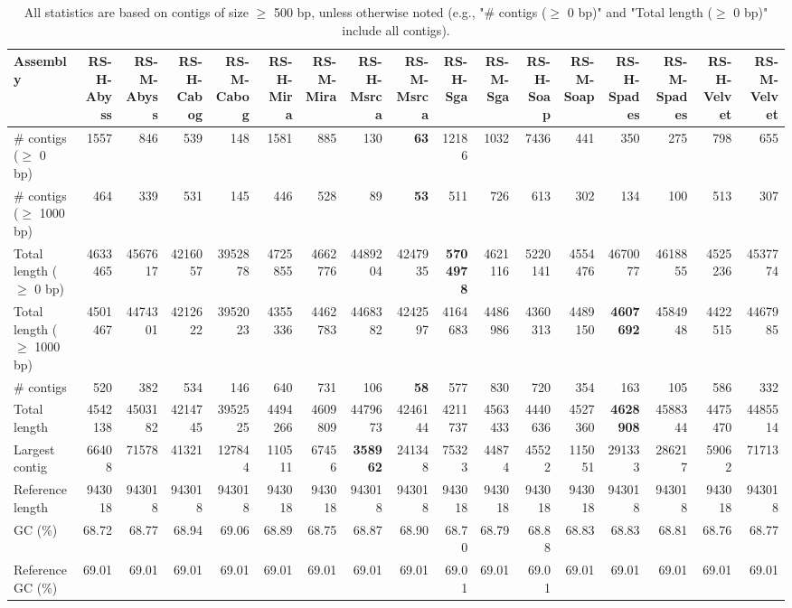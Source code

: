 \documentclass[12pt,a4paper]{article}
\begin{document}
\begin{table}[ht]
\begin{center}
\caption{All statistics are based on contigs of size $\geq$ 500 bp, unless otherwise noted (e.g., "\# contigs ($\geq$ 0 bp)" and "Total length ($\geq$ 0 bp)" include all contigs).}
\begin{tabular}{|l*{16}{|r}|}
\hline
Assembly & RS-H-Abyss & RS-M-Abyss & RS-H-Cabog & RS-M-Cabog & RS-H-Mira & RS-M-Mira & RS-H-Msrca & RS-M-Msrca & RS-H-Sga & RS-M-Sga & RS-H-Soap & RS-M-Soap & RS-H-Spades & RS-M-Spades & RS-H-Velvet & RS-M-Velvet \\ \hline
\# contigs ($\geq$ 0 bp) & 1557 & 846 & 539 & 148 & 1581 & 885 & 130 & {\bf 63} & 12186 & 1032 & 7436 & 441 & 350 & 275 & 798 & 655 \\ \hline
\# contigs ($\geq$ 1000 bp) & 464 & 339 & 531 & 145 & 446 & 528 & 89 & {\bf 53} & 511 & 726 & 613 & 302 & 134 & 100 & 513 & 307 \\ \hline
Total length ($\geq$ 0 bp) & 4633465 & 4567617 & 4216057 & 3952878 & 4725855 & 4662776 & 4489204 & 4247935 & {\bf 5704978} & 4621116 & 5220141 & 4554476 & 4670077 & 4618855 & 4525236 & 4537774 \\ \hline
Total length ($\geq$ 1000 bp) & 4501467 & 4474301 & 4212622 & 3952023 & 4355336 & 4462783 & 4468382 & 4242597 & 4164683 & 4486986 & 4360313 & 4489150 & {\bf 4607692} & 4584948 & 4422515 & 4467985 \\ \hline
\# contigs & 520 & 382 & 534 & 146 & 640 & 731 & 106 & {\bf 58} & 577 & 830 & 720 & 354 & 163 & 105 & 586 & 332 \\ \hline
Total length & 4542138 & 4503182 & 4214745 & 3952525 & 4494266 & 4609809 & 4479673 & 4246144 & 4211737 & 4563433 & 4440636 & 4527360 & {\bf 4628908} & 4588344 & 4475470 & 4485514 \\ \hline
Largest contig & 66408 & 71578 & 41321 & 127844 & 110511 & 67456 & {\bf 358962} & 241348 & 75323 & 44874 & 45522 & 115051 & 291333 & 286217 & 59062 & 71713 \\ \hline
Reference length & 943018 & 943018 & 943018 & 943018 & 943018 & 943018 & 943018 & 943018 & 943018 & 943018 & 943018 & 943018 & 943018 & 943018 & 943018 & 943018 \\ \hline
GC (\%) & 68.72 & 68.77 & 68.94 & 69.06 & 68.89 & 68.75 & 68.87 & 68.90 & 68.70 & 68.79 & 68.88 & 68.83 & 68.83 & 68.81 & 68.76 & 68.77 \\ \hline
Reference GC (\%) & 69.01 & 69.01 & 69.01 & 69.01 & 69.01 & 69.01 & 69.01 & 69.01 & 69.01 & 69.01 & 69.01 & 69.01 & 69.01 & 69.01 & 69.01 & 69.01 \\ \hline

\end{tabular}
\end{center}
\end{table}
\end{document}
